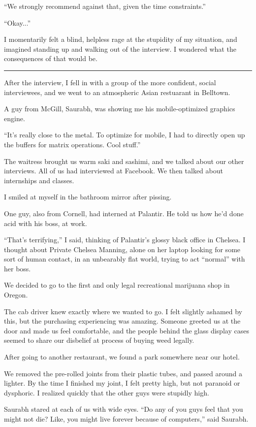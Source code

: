``We strongly recommend against that, given the time constraints.''

``Okay...''

I momentarily felt a blind, helpless rage at the stupidity of my situation, and
imagined standing up and walking out of the interview.  I wondered what the
consequences of that would be.  

\plainfancybreak{12pt}{2}{* * *}

After the interview, I fell in with a group of the more confident, social
interviewees, and we went to an atmospheric Asian restuarant in Belltown.

A guy from McGill, Saurabh, was showing me his mobile-optimized graphics engine.

``It's really close to the metal.  To optimize for mobile, I had to directly
open up the buffers for matrix operations.  Cool stuff.''

The waitress brought us warm saki and sashimi, and we talked about our other
interviews.  All of us had interviewed at Facebook.  We then talked about
internships and classes.  

I smiled at myself in the bathroom mirror after pissing.

One guy, also from Cornell, had interned at Palantir.  He told us how he'd done
acid with his boss, at work. 

``That's terrifying,'' I said, thinking of Palantir's glossy black office in
Chelsea.  I thought about Private Chelsea Manning, alone on her laptop looking
for some sort of human contact, in an unbearably flat world, trying to act
``normal'' with her boss.

We decided to go to the first and only legal recreational marijuana shop in
Oregon.

The cab driver knew exactly where we wanted to go.  I felt slightly ashamed by
this, but the purchasing experiencing was amazing.  Someone greeted us at the
door and made us feel comfortable, and the people behind the glass display cases
seemed to share our disbelief at process of buying weed legally.

After going to another restaurant, we found a park somewhere near our hotel.

We removed the pre-rolled joints from their plastic tubes, and passed around a
lighter.  By the time I finished my joint, I felt pretty high, but not paranoid
or dysphoric.  I realized quickly that the other guys were stupidly high.

Saurabh stared at each of us with wide eyes.  ``Do any of you guys feel that you
might not die?  Like, you might live forever because of computers,'' said
Saurabh.  

